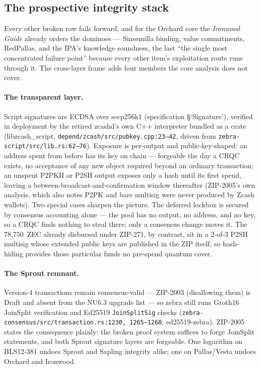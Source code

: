 \documentclass[11pt,a4paper]{article}
\theoremstyle{definition}
\begin{document}
\subsection{The prospective integrity stack}\label{sec:pq-prosp}

Every other broken row fails forward, and for the Orchard core the
\emph{Ironwood Guide} already orders the dominoes --- Sinsemilla
binding, value commitments, RedPallas, and the IPA's knowledge
soundness, the last ``the single most concentrated failure point''
because every other item's exploitation route runs through it. The
cross-layer frame adds four members the core analysis does not cover.

\paragraph{The transparent layer.} Script signatures are ECDSA over
secp256k1 (specification \S`Signature'), verified in deployment by the
retired \textsf{zcashd}'s own C++ interpreter bundled as a crate
(\textsf{libzcash\_script}, \texttt{depend/zcash/src/pubkey.cpp:23--42},
driven from \texttt{zebra-script/src/lib.rs:62--76}). Exposure is
per-output and public-key-shaped: an address spent from before has its
key on chain --- forgeable the day a CRQC exists, no acceptance of any
new object required beyond an ordinary transaction; an unspent P2PKH or
P2SH output exposes only a hash until its first spend, leaving a
between-broadcast-and-confirmation window thereafter (ZIP-2005's own
analysis, which also notes P2PK and bare multisig were never produced
by Zcash wallets). Two special cases sharpen the picture. The deferred
lockbox is secured by consensus accounting alone --- the pool has no
output, no address, and no key, so a CRQC finds nothing to steal there;
only a consensus change moves it. The 78{,}750~ZEC already disbursed
under ZIP-271, by contrast, sit in a 2-of-3 P2SH multisig whose
extended public keys are published in the ZIP itself, so hash-hiding
provides those particular funds no pre-spend quantum cover.

\paragraph{The Sprout remnant.} Version-4 transactions remain
consensus-valid --- ZIP-2003 (disallowing them) is Draft and absent
from the NU6.3 upgrade list --- so \textsf{zebra} still runs Groth16
JoinSplit verification and Ed25519 \texttt{JoinSplitSig} checks
(\texttt{zebra-consensus/src/transaction.rs:1230, 1265--1268};
\textsf{ed25519-zebra}). ZIP-2005 states the consequence plainly: the
broken proof system suffices to forge JoinSplit statements, and both
Sprout signature layers are forgeable. One logarithm on BLS12-381
undoes Sprout and Sapling integrity alike; one on Pallas/Vesta undoes
Orchard and Ironwood.
\end{document}
